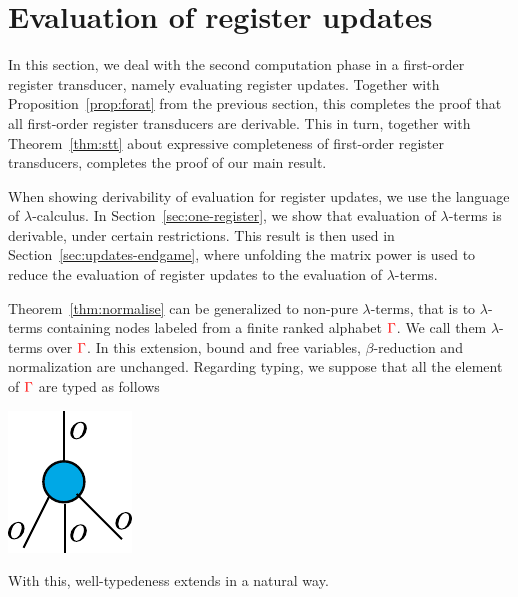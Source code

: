 
\section{Evaluation of register updates}
\label{sec:stt-derivable}
In this section, we deal with the second computation phase in a first-order register transducer, namely evaluating register updates. Together with Proposition~\ref{prop:forat} from the previous section, this completes the proof that all first-order register transducers are derivable. This in turn, together with Theorem~\ref{thm:stt} about expressive completeness of first-order register transducers, completes the proof of our main result. 


When showing derivability of  evaluation for register updates, we  use the language of $\lambda$-calculus.  In Section~\ref{sec:one-register},  we show that evaluation of $\lambda$-terms is derivable, under certain restrictions. This result is then used in Section~\ref{sec:updates-endgame}, where unfolding the matrix power is used to reduce the evaluation of register updates to the evaluation of $\lambda$-terms.  


%

Theorem~\ref{thm:normalise} can be generalized to non-pure $\lambda$-terms, that is to $\lambda$-terms containing nodes labeled from a finite ranked alphabet ${\color{red}{\Gamma}}$.  We call them $\lambda$-terms over ${\color{red}{\Gamma}}$. In this extension,  bound and free variables, $\beta$-reduction and normalization are unchanged. Regarding typing, we suppose that all the element of ${\color{red}{\Gamma}}$ are typed as follows
\begin{center}
\includegraphics[scale=.4]{pictures/type-gamma}
\end{center}
With this, well-typedeness extends in a natural way. 

